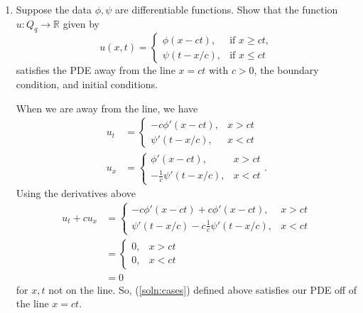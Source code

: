 \documentclass[a4paper,12pt]{article}
\newcommand{\reals}{\mathbb{R}}
\begin{document}
    \begin{enumerate}[label = \textbf{(\alph*)}]
        \item Suppose the data $ \phi, \psi $ are differentiable functions. Show that the function $ u : Q_{q} \to \reals $ given by 
        \begin{equation}
            u(x, t) = \begin{cases}
                \phi(x - ct), & \text{if } x \geq ct, \\
                \psi(t - x/c), & \text{if } x \leq ct
            \end{cases}
            \label{soln:cases}
        \end{equation}
        satisfies the PDE away from the line $ x = ct $ with $c > 0$, the boundary condition, and initial conditions. 
        
        When we are away from the line, we have
        \begin{align*}
            u_t &= \begin{cases}
                -c \phi'(x - ct), & x > ct \\
                \psi'(t - x/c), & x < ct
            \end{cases} \\
            u_x &= \begin{cases}
                \phi'(x - ct), & x > ct \\
                -\frac{1}{c} \psi'(t - x/c), & x < ct
            \end{cases}.
        \end{align*}
        Using the derivatives above
        \begin{align*}
            u_t + c u_x &= \begin{cases}
                -c \phi'(x - ct) + c \phi'(x - ct), & x > ct\\
                \psi'(t - x/c) - c \frac{1}{c} \psi'(t - x/c), & x < ct
            \end{cases} \\
            &= \begin{cases}
                0, & x > ct\\
                0, & x < ct
            \end{cases} \\
            &= 0
        \end{align*}
        for $ x,t $ not on the line. So, (\ref{soln:cases})  defined above satisfies our PDE off of the line $ x = ct $. 
        

\end{enumerate}
\end{document}

